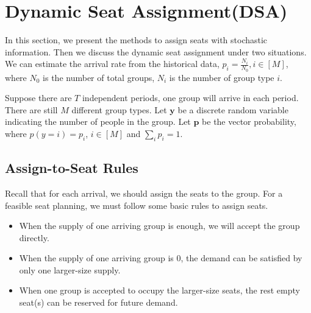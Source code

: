 
\section{Dynamic Seat Assignment(DSA)}
In this section, we present the methods to assign seats with stochastic information. Then we discuss the dynamic seat assignment under two situations. We can estimate the arrival rate from the historical data, $p_i = \frac{N_{i}}{N_{0}}, i \in [M]$, where $N_{0}$ is the number of total groups, $N_{i}$ is the number of group type $i$.

Suppose there are $T$ independent periods, one group will arrive in each period.
There are still $M$ different group types. Let $\mathbf{y}$ be a discrete random variable indicating the number of people in the group. Let $\mathbf{p}$ be the vector probability, where $p(y = i) = p_i$, $i \in [M]$ and $\sum_{i} p_{i} =1$. 





\subsection{Assign-to-Seat Rules}\label{nested_policy}
Recall that for each arrival, we should assign the seats to the group. 
For a feasible seat planning, we must follow some basic rules to assign seats.
\begin{itemize}
    \item When the supply of one arriving group is enough, we will accept the group directly.
    \item When the supply of one arriving group is 0, the demand can be satisfied by only one larger-size supply.
    \item When one group is accepted to occupy the larger-size seats, the rest empty seat(s) can be reserved for future demand.
\end{itemize}

